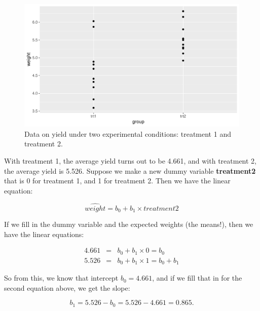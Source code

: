\documentclass[]{report}\usepackage[]{graphicx}\usepackage[]{color}
\makeatletter
\def\maxwidth{ %
  \ifdim\Gin@nat@width>\linewidth
    \linewidth
  \else
    \Gin@nat@width
  \fi
}
\newenvironment{knitrout}{}{} %
\makeatother
\begin{document}
\begin{knitrout}
\color{fgcolor}\begin{figure}

{\centering \includegraphics[width=\maxwidth]{figure/dummy_8-1} 

}

\caption[Data on yield under two experimental conditions]{Data on yield under two experimental conditions: treatment 1 and treatment 2.}\label{fig:dummy_8}
\end{figure}


\end{knitrout}

With treatment 1, the average yield turns out to be 4.661, and with treatment 2, the average yield is 5.526. Suppose we make a new dummy variable \textbf{treatment2} that is 0 for treatment 1, and 1 for treatment 2. Then we have the linear equation:

\begin{equation}
\widehat{weight} = b_0 + b_1 \times treatment2
\end{equation}

If we fill in the dummy variable and the expected weights (the means!), then we have the linear equations:


\begin{eqnarray}
4.661 &=& b_0 + b_1 \times 0 = b_0 \\
5.526 &=& b_0 + b_1 \times 1 = b_0 + b_1
\end{eqnarray}

So from this, we know that intercept $b_0 = 4.661$, and if we fill that in for the second equation above, we get the slope: 

\begin{equation}
b_1 = 5.526-b_0= 5.526 -4.661= 0.865.
\end{equation}
\end{document}
